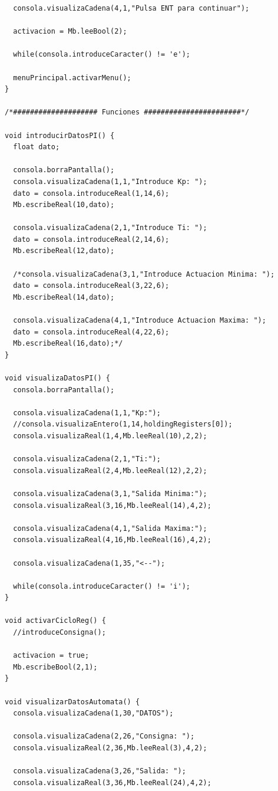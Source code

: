 \documentclass[11pt,twoside]{book}
\begin{document}
\begin{lstlisting}
  consola.visualizaCadena(4,1,"Pulsa ENT para continuar");

  activacion = Mb.leeBool(2);

  while(consola.introduceCaracter() != 'e');

  menuPrincipal.activarMenu();
}

/*#################### Funciones #######################*/

void introducirDatosPI() {
  float dato;

  consola.borraPantalla();
  consola.visualizaCadena(1,1,"Introduce Kp: ");
  dato = consola.introduceReal(1,14,6);
  Mb.escribeReal(10,dato);

  consola.visualizaCadena(2,1,"Introduce Ti: ");
  dato = consola.introduceReal(2,14,6);
  Mb.escribeReal(12,dato);

  /*consola.visualizaCadena(3,1,"Introduce Actuacion Minima: ");
  dato = consola.introduceReal(3,22,6);
  Mb.escribeReal(14,dato);

  consola.visualizaCadena(4,1,"Introduce Actuacion Maxima: ");
  dato = consola.introduceReal(4,22,6);
  Mb.escribeReal(16,dato);*/
}

void visualizaDatosPI() {
  consola.borraPantalla();

  consola.visualizaCadena(1,1,"Kp:");
  //consola.visualizaEntero(1,14,holdingRegisters[0]);
  consola.visualizaReal(1,4,Mb.leeReal(10),2,2);

  consola.visualizaCadena(2,1,"Ti:");
  consola.visualizaReal(2,4,Mb.leeReal(12),2,2);

  consola.visualizaCadena(3,1,"Salida Minima:");
  consola.visualizaReal(3,16,Mb.leeReal(14),4,2);

  consola.visualizaCadena(4,1,"Salida Maxima:");
  consola.visualizaReal(4,16,Mb.leeReal(16),4,2);

  consola.visualizaCadena(1,35,"<--");

  while(consola.introduceCaracter() != 'i');
}

void activarCicloReg() {
  //introduceConsigna();

  activacion = true;
  Mb.escribeBool(2,1);
}

void visualizarDatosAutomata() {
  consola.visualizaCadena(1,30,"DATOS");

  consola.visualizaCadena(2,26,"Consigna: ");
  consola.visualizaReal(2,36,Mb.leeReal(3),4,2);

  consola.visualizaCadena(3,26,"Salida: ");
  consola.visualizaReal(3,36,Mb.leeReal(24),4,2);


\end{lstlisting}
\end{document}
